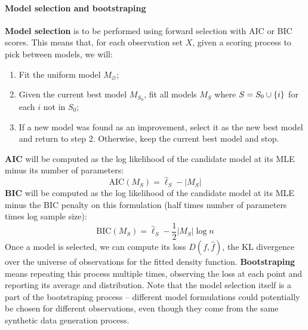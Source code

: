 \paragraph{Model selection and bootstraping}\label{model-selection-and-bootstraping}
\textbf{Model selection} is to be performed using forward selection with
AIC or BIC scores. This means that, for each observation set \(X\),
given a scoring process to pick between models, we will:
\begin{enumerate}[tightlist,label={\arabic*.}]
\item
  Fit the uniform model \(M_\varnothing\);
\item
  Given the current best model \(M_{S_{0}}\), fit all models \(M_{S}\)
  where \(S = S_{0} \cup \{ i \}\) for each \(i\) not in \(S_{0}\);
\item
  If a new model was found as an improvement, select it as the new best
  model and return to step 2. Otherwise, keep the current best model and
  stop.
\end{enumerate}
\textbf{AIC} will be computed as the log likelihood of the candidate
model at its MLE minus its number of parameters:
\[
\text{AIC}(M_S) = \hat{\ell}_S - |M_S|
\]
\textbf{BIC} will be computed as the log likelihood of the candidate
model at its MLE minus the BIC penalty on this formulation (half times
number of parameters times log sample size):
\[
\text{BIC}(M_S) = \hat{\ell}_S - \frac{1}{2} |M_S| \log n
\]
Once a model is selected, we can compute its loss \(D(f, \hat{f})\), the
KL divergence over the universe of observations for the fitted density
function.
\textbf{Bootstraping} means repeating this process multiple times,
observing the loss at each point and reporting its average and
distribution. Note that the model selection itself is a part of the
bootstraping process -- different model formulations could potentially
be chosen for different observations, even though they come from the
same synthetic data generation process.

